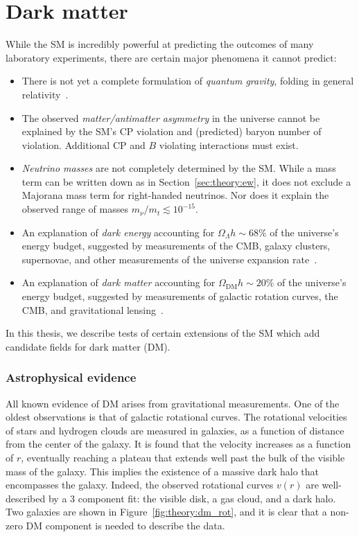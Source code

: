 \section{Dark matter}

While the SM is incredibly powerful at predicting the outcomes of many laboratory experiments, there are certain major phenomena it cannot predict:
\begin{itemize}
    \item There is not yet a complete formulation of \emph{quantum gravity}, folding in general relativity~\cite{gr}.
    \item The observed \emph{matter/antimatter asymmetry} in the universe cannot be explained by the SM's CP violation and (predicted) baryon number of violation. 
          Additional CP and $B$ violating interactions must exist.
    \item \emph{Neutrino masses} are not completely determined by the SM. 
            While a mass term can be written down as in Section~\ref{sec:theory:ew}, it does not exclude a Majorana mass term for right-handed neutrinos. 
            Nor does it explain the observed range of masses $m_\nu/m_t \lesssim 10^{-15}$. 
    \item An explanation of \emph{dark energy} accounting for $\Omega_\Lambda h \sim 68\%$ of the universe's energy budget, suggested by measurements of the CMB, galaxy clusters, supernovae, and other measurements of the universe expansion rate~\cite{darkenergy}.
    \item An explanation of \emph{dark matter} accounting for $\Omega_\mathrm{DM} h \sim 20\%$ of the universe's energy budget, suggested by measurements of galactic rotation curves, the CMB, and gravitational lensing~\cite{pdg,dm1,dm2,dm3}.
\end{itemize}
In this thesis, we describe tests of certain extensions of the SM which add candidate fields for dark matter (DM). 

\subsubsection{Astrophysical evidence}
All known evidence of DM arises from gravitational measurements.
One of the oldest observations is that of galactic rotational curves.
The rotational velocities of stars and hydrogen clouds are measured in galaxies, as a function of distance from the center of the galaxy.
It is found that the velocity increases as a function of $r$, eventually reaching a plateau that extends well past the bulk of the visible mass of the galaxy.
This implies the existence of a massive dark halo that encompasses the galaxy.
Indeed, the observed rotational curves $v(r)$ are well-described by a 3 component fit: the visible disk, a gas cloud, and a dark halo. 
Two galaxies are shown in Figure~\ref{fig:theory:dm_rot}, and it is clear that a non-zero DM component is needed to describe the data.

